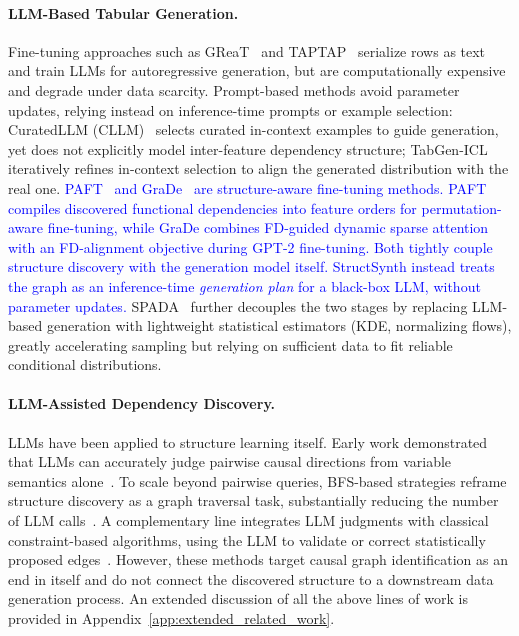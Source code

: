 \paragraph{LLM-Based Tabular Generation.}
Fine-tuning approaches such as GReaT~\cite{borisov2023language} and TAPTAP~\cite{zhang2023generative} serialize rows as text and train LLMs for autoregressive generation, but are computationally expensive and degrade under data scarcity.
Prompt-based methods avoid parameter updates, relying instead on inference-time prompts or example selection: CuratedLLM (CLLM)~\cite{cllm2024} selects curated in-context examples to guide generation, yet does not explicitly model inter-feature dependency structure; TabGen-ICL~\cite{fang-etal-2025-tabgen} iteratively refines in-context selection to align the generated distribution with the real one.
\textcolor{blue}{PAFT~\cite{xu2024why} and GraDe~\cite{zhang-etal-2025-features} are structure-aware fine-tuning methods. PAFT compiles discovered functional dependencies into feature orders for permutation-aware fine-tuning, while GraDe combines FD-guided dynamic sparse attention with an FD-alignment objective during GPT-2 fine-tuning. Both tightly couple structure discovery with the generation model itself. \textsf{StructSynth} instead treats the graph as an inference-time \textit{generation plan} for a black-box LLM, without parameter updates.}
SPADA~\cite{yang2025doubling} further decouples the two stages by replacing LLM-based generation with lightweight statistical estimators (KDE, normalizing flows), greatly accelerating sampling but relying on sufficient data to fit reliable conditional distributions.

\paragraph{LLM-Assisted Dependency Discovery.}
LLMs have been applied to structure learning itself. Early work demonstrated that LLMs can accurately judge pairwise causal directions from variable semantics alone~\cite{kiciman2023causal}. To scale beyond pairwise queries, BFS-based strategies reframe structure discovery as a graph traversal task, substantially reducing the number of LLM calls~\cite{jiralerspong2024efficient, zanna2025fairness}. A complementary line integrates LLM judgments with classical constraint-based algorithms, using the LLM to validate or correct statistically proposed edges~\cite{ban2023causal}.
However, these methods target causal graph identification as an end in itself and do not connect the discovered structure to a downstream data generation process.
An extended discussion of all the above lines of work is provided in Appendix~\ref{app:extended_related_work}.
